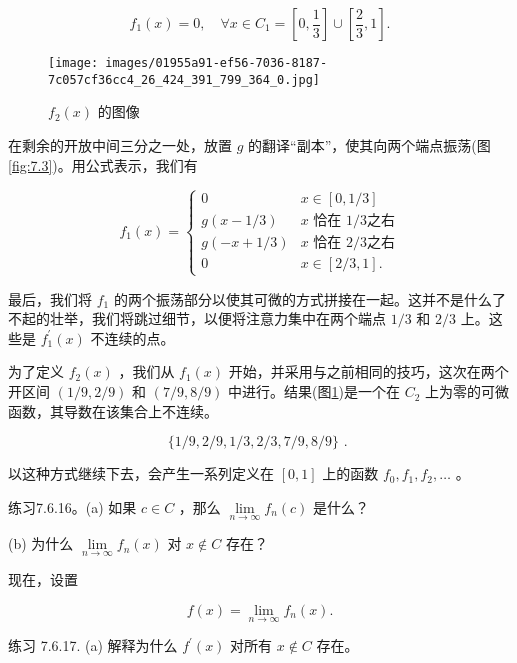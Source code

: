 \[
{f}_{1}\left( x\right)  = 0,\quad \forall x \in  {C}_{1} = \left\lbrack  {0,\frac{1}{3}}\right\rbrack   \cup  \left\lbrack  {\frac{2}{3},1}\right\rbrack  .
\]


\begin{figure}[h]
  \centering
  \texttt{[image: images/01955a91-ef56-7036-8187-7c057cf36cc4\_26\_424\_391\_799\_364\_0.jpg]}
  \caption{\({f}_{2}\left( x\right)\) 的图像}
  \label{fig:7.4}
\end{figure}

在剩余的开放中间三分之一处，放置 \(g\) 的翻译“副本”，使其向两个端点振荡(图\ref{fig:7.3})。用公式表示，我们有

\[
{f}_{1}\left( x\right)  = \left\{  \begin{array}{ll} 0 & x \in  \left\lbrack  {0,1/3}\right\rbrack  \\  g\left( {x - 1/3}\right) & x\text{ 恰在 }1/3 \text{之右} \\  g\left( {-x + 1/3}\right) & x\text{ 恰在 }2/3 \text{之右} \\  0 & x \in  \left\lbrack  {2/3,1}\right\rbrack  . \end{array}\right.
\]

最后，我们将 \({f}_{1}\) 的两个振荡部分以使其可微的方式拼接在一起。这并不是什么了不起的壮举，我们将跳过细节，以便将注意力集中在两个端点 \(1/3\) 和 \(2/3\) 上。这些是 \({f}_{1}^{\prime }\left( x\right)\) 不连续的点。

为了定义 \({f}_{2}\left( x\right)\) ，我们从 \({f}_{1}\left( x\right)\) 开始，并采用与之前相同的技巧，这次在两个开区间 \(\left( {1/9,2/9}\right)\) 和 \(\left( {7/9,8/9}\right)\) 中进行。结果(图\ref{fig:7.4})是一个在 \({C}_{2}\) 上为零的可微函数，其导数在该集合上不连续。

\[
\{ 1/9,2/9,1/3,2/3,7/9,8/9\} \text{ . }
\]

以这种方式继续下去，会产生一系列定义在 \(\left\lbrack  {0,1}\right\rbrack\) 上的函数 \({f}_{0},{f}_{1},{f}_{2},\ldots\) 。

练习7.6.16。(a) 如果 \(c \in  C\) ，那么 \(\mathop{\lim }\limits_{{n \rightarrow  \infty }}{f}_{n}\left( c\right)\) 是什么？

(b) 为什么 \(\mathop{\lim }\limits_{{n \rightarrow  \infty }}{f}_{n}\left( x\right)\) 对 \(x \notin  C\) 存在？

现在，设置

\[
f\left( x\right)  = \mathop{\lim }\limits_{{n \rightarrow  \infty }}{f}_{n}\left( x\right) .
\]

练习 7.6.17. (a) 解释为什么 \({f}^{\prime }\left( x\right)\) 对所有 \(x \notin  C\) 存在。

